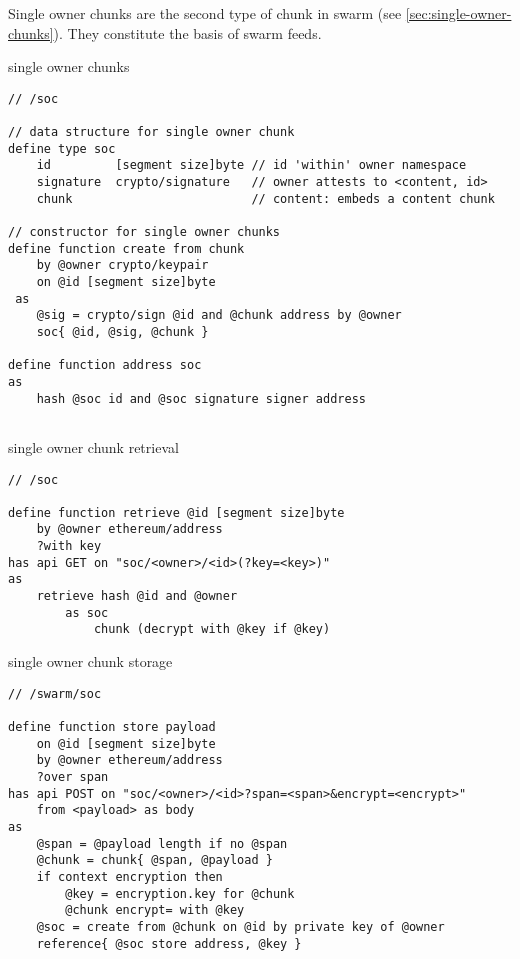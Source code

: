 Single owner chunks are the second type of chunk in swarm (see \ref{sec:single-owner-chunks}). They constitute the basis of swarm feeds.


\begin{definition}{single owner chunks}\label{def:soc}
\begin{lstlisting}[language=buzz1]
// /soc

// data structure for single owner chunk
define type soc 
    id         [segment size]byte // id 'within' owner namespace
    signature  crypto/signature   // owner attests to <content, id> 
    chunk                         // content: embeds a content chunk

// constructor for single owner chunks
define function create from chunk 
    by @owner crypto/keypair
    on @id [segment size]byte
 as
    @sig = crypto/sign @id and @chunk address by @owner
    soc{ @id, @sig, @chunk }

define function address soc
as
    hash @soc id and @soc signature signer address
    
\end{lstlisting}
\end{definition}

\begin{definition}{single owner chunk retrieval}\label{def:soc-retrieve}
\begin{lstlisting}[language=buzz1]
// /soc

define function retrieve @id [segment size]byte
    by @owner ethereum/address
    ?with key
has api GET on "soc/<owner>/<id>(?key=<key>)"
as
    retrieve hash @id and @owner 
        as soc
            chunk (decrypt with @key if @key)
\end{lstlisting}
\end{definition}


\begin{definition}{single owner chunk storage}\label{def:soc-store}
\begin{lstlisting}[language=buzz1]
// /swarm/soc

define function store payload
    on @id [segment size]byte
    by @owner ethereum/address 
    ?over span
has api POST on "soc/<owner>/<id>?span=<span>&encrypt=<encrypt>"
    from <payload> as body
as 
    @span = @payload length if no @span
    @chunk = chunk{ @span, @payload }
    if context encryption then
        @key = encryption.key for @chunk 
        @chunk encrypt= with @key
    @soc = create from @chunk on @id by private key of @owner
    reference{ @soc store address, @key }
             
\end{lstlisting}
\end{definition}
